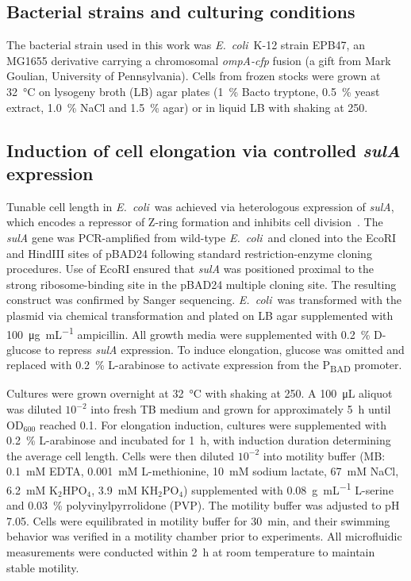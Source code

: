 \documentclass[twoside,twocolumn,9pt]{article}
\newcommand{\ecoli}{{\it E.~coli}}
\begin{document}
    \subsection*{Bacterial strains and culturing conditions}
    
    The bacterial strain used in this work was \ecoli\ K-12 strain EPB47, an MG1655 derivative carrying a chromosomal \textit{ompA-cfp} fusion (a gift from Mark Goulian, University of Pennsylvania). Cells from frozen stocks were grown at \SI{32}{\degreeCelsius} on lysogeny broth (LB) agar plates (\SI{1}{\percent} Bacto tryptone, \SI{0.5}{\percent} yeast extract, \SI{1.0}{\percent} NaCl and \SI{1.5}{\percent} agar) or in liquid LB with shaking at \SI{250}{\rpm}.

    \subsection*{Induction of cell elongation via controlled \textit{sulA} expression}

    Tunable cell length in \ecoli\ was achieved via heterologous expression of \textit{sulA}, which encodes a repressor of Z-ring formation and inhibits cell division~\cite{Higashitani1995-qn,Gao2026-vq}. The \textit{sulA} gene was PCR-amplified from wild-type \ecoli\ and cloned into the EcoRI and HindIII sites of pBAD24 following standard restriction-enzyme cloning procedures. Use of EcoRI ensured that \textit{sulA} was positioned proximal to the strong ribosome-binding site in the pBAD24 multiple cloning site. The resulting construct was confirmed by Sanger sequencing. \ecoli\ was transformed with the plasmid via chemical transformation and plated on LB agar supplemented with \SI{100}{\micro\gram\per\milli\liter} ampicillin. All growth media were supplemented with \SI{0.2}{\percent} D-glucose to repress \textit{sulA} expression. To induce elongation, glucose was omitted and replaced with \SI{0.2}{\percent} L-arabinose to activate expression from the P\textsubscript{BAD} promoter.
    
    Cultures were grown overnight at \SI{32}{\celsius} with shaking at \SI{250}{\rpm}. A \SI{100}{\micro\liter} aliquot was diluted $10^{-2}$ into fresh TB medium and grown for approximately \SI{5}{\hour} until OD$_{600}$ reached 0.1. For elongation induction, cultures were supplemented with \SI{0.2}{\percent} L-arabinose and incubated for \SI{1}{\hour}, with induction duration determining the average cell length. Cells were then diluted $10^{-2}$ into motility buffer (MB: \SI{0.1}{mM} EDTA, \SI{0.001}{mM} L-methionine, \SI{10}{mM} sodium lactate, \SI{67}{mM} NaCl, \SI{6.2}{mM} K$_2$HPO$_4$, \SI{3.9}{mM} KH$_2$PO$_4$) supplemented with \SI{0.08}{\gram\per\milli\liter} L-serine and \SI{0.03}{\percent} polyvinylpyrrolidone (PVP). The motility buffer was adjusted to pH 7.05. Cells were equilibrated in motility buffer for \SI{30}{\minute}, and their swimming behavior was verified in a motility chamber prior to experiments. All microfluidic measurements were conducted within \SI{2}{\hour} at room temperature to maintain stable motility.
\end{document}
